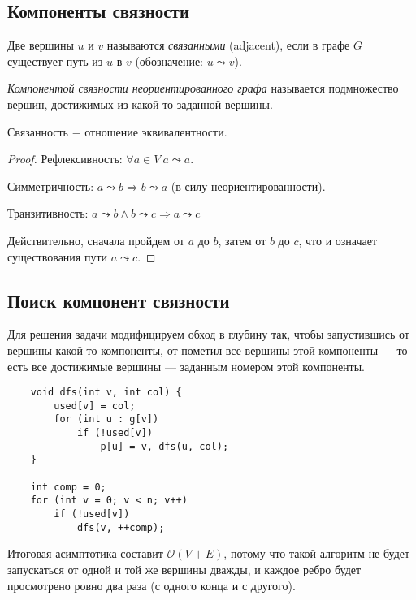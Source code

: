 \subsection{Компоненты связности}

\begin{definition}
    Две вершины $u$ и $v$ называются \textit{связанными} (adjacent), если в графе $G$ существует путь из $u$ в $v$ (обозначение: $u\leadsto v$).
\end{definition}

\begin{definition}
    \textit{Компонентой связности неориентированного графа} называется подмножество вершин, достижимых из какой-то заданной вершины.
\end{definition}

\begin{theorem}
    Связанность $-$ отношение эквивалентности.
\end{theorem}

\begin{proof}
    Рефлексивность: $\forall a \in V\ a\leadsto a$.

    Симметричность: $a\leadsto b \Rightarrow b\leadsto a$ (в силу неориентированности).

    Транзитивность: $a\leadsto b \wedge b\leadsto c\Rightarrow a\leadsto c$

    Действительно, сначала пройдем от $a$ до $b$, затем от $b$ до $c$, что и означает существования пути $a\leadsto c$.
\end{proof}

\subsection*{Поиск компонент связности}

Для решения задачи модифицируем обход в глубину так, чтобы запустившись от вершины какой-то компоненты, от пометил все вершины этой компоненты — то есть все достижимые вершины — заданным номером этой компоненты.

\begin{lstlisting}
    void dfs(int v, int col) {
        used[v] = col;
        for (int u : g[v])
            if (!used[v])
                p[u] = v, dfs(u, col);
    }

    int comp = 0;
    for (int v = 0; v < n; v++)
        if (!used[v])
            dfs(v, ++comp);
\end{lstlisting}

Итоговая асимптотика составит $\mathcal{O}(V+E)$, потому что такой алгоритм не будет запускаться от одной и той же вершины дважды, и каждое ребро будет просмотрено ровно два раза (с одного конца и с другого).

